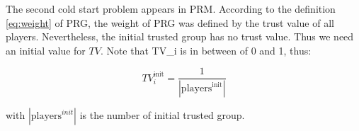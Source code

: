 The second cold start problem appears in PRM. According to the definition \ref{eq:weight} of PRG, the weight
of PRG was defined by the trust value of all players. Nevertheless, the initial trusted group has
no trust value. Thus we need an initial value for $TV$. Note that TV\_i is in between of 0 and 1, thus:

\[
TV_{i}^{\text{init}} = \frac{1}{|\text{players}^{\text{init}}|}
\]

with $|\text{players}^{init}|$ is the number of initial trusted group. 